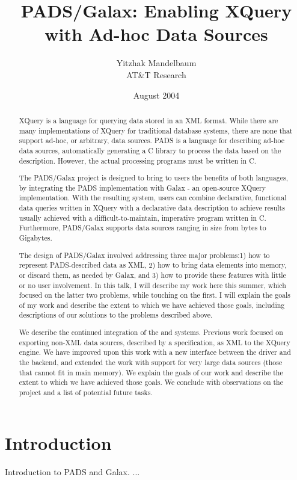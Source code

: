 \documentclass{article}
\title{PADS/Galax: Enabling XQuery with Ad-hoc Data Sources}
\author{
  Yitzhak Mandelbaum \\ 
  AT\&T Research
}
\date{August 2004}
\begin{document}
\maketitle
\begin{abstract}
  XQuery is a language for querying data stored in an XML format.
  While there are many implementations of XQuery for traditional
  database systems, there are none that support ad-hoc, or arbitrary,
  data sources. PADS is a language for describing ad-hoc data sources,
  automatically generating a C library to process the data based on
  the description. However, the actual processing programs must be
  written in C.
  
  The PADS/Galax project is designed to bring to users the benefits of
  both languages, by integrating the PADS implementation with Galax -
  an open-source XQuery implementation. With the resulting system,
  users can combine declarative, functional data queries written in
  XQuery with a declarative data description to achieve results
  usually achieved with a difficult-to-maintain, imperative program
  written in C.  Furthermore, PADS/Galax supports data sources ranging
  in size from bytes to Gigabytes.
  
  The design of PADS/Galax involved addressing three major problems:1)
  how to represent PADS-described data as XML, 2) how to bring data
  elements into memory, or discard them, as needed by Galax, and 3)
  how to provide these features with little or no user involvement. In
  this talk, I will describe my work here this summer, which focused
  on the latter two problems, while touching on the first. I will
  explain the goals of my work and describe the extent to which we
  have achieved those goals, including descriptions of our solutions
  to the problems described above.

  We describe the continued integration of the \pads and \galax
  systems. Previous work focused on exporting non-XML data sources,
  described by a \pads specification, as XML to the \galax XQuery
  engine. We have improved upon this work with a new interface between
  the \galax \pads driver and the \pads backend, and extended the work
  with support for very large data sources (those that cannot fit in
  main memory). We explain the goals of our work and describe the
  extent to which we have achieved those goals. We conclude with
  observations on the project and a list of potential future tasks.
\end{abstract}

\section{Introduction}
Introduction to PADS and Galax. ...  
\end{document}
